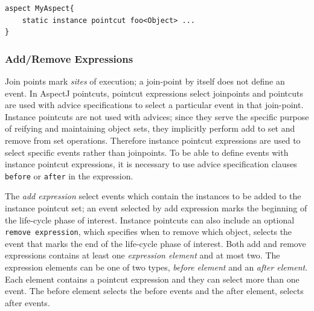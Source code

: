 \documentclass{llncs}
\begin{document}
\begin{lstlisting}[float=h!, caption={An instance pointcut declaration in an aspect}, label={lst:member}]
aspect MyAspect{
	static instance pointcut foo<Object> ...
}
\end{lstlisting}

\subsubsection{Add/Remove Expressions}
Join points mark \emph{sites} of execution; a join-point by itself does not define an event. 
In AspectJ pointcuts, pointcut expressions select joinpoints and pointcuts are used with advice specifications to select a particular event in that join-point.
Instance pointcuts are not used with advices; since they serve the specific purpose of reifying and maintaining object sets, they implicitly perform add to set and remove from set operations. 
Therefore instance pointcut expressions are used to select specific events rather than joinpoints.
To be able to define events with instance pointcut expressions, it is necessary to use advice specification clauses \texttt{before} or \texttt{after} in the expression. 

The \emph{add expression} select events which contain the instances to be added to the instance pointcut set; an event selected by add expression marks the beginning of the life-cycle phase of interest. 
Instance pointcuts can also include an optional \texttt{remove expression},  which specifies when to remove which object, selects the event that marks the end of the life-cycle phase of interest.
Both add and remove expressions contains at least one \emph{expression element} and at most two.
The expression elements can be one of two types, \emph{before element} and an \emph{after element}.
Each element contains a pointcut expression and they can select more than one event. 
The before element selects the before events and the after element, selects after events. 
\end{document}
